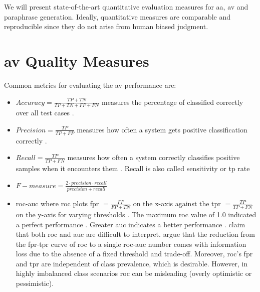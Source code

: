
We will present state-of-the-art quantitative evaluation measures for \ac{aa}, \ac{av} and paraphrase generation.
Ideally, quantitative measures are comparable and reproducible since they do not arise from human biased judgment.

\section{\ac{av} Quality Measures}
\label{sec:av_quality_measures}

Common metrics for evaluating the \ac{av} performance are:
\begin{itemize}
    \item $Accuracy = \frac{TP + TN}{TP + TN + FP + FN}$ \citep{elmanarelbouanani_authorship_2014,neal_surveying_2018} 
    measures the percentage of classified correctly over all test cases \citep{neal_surveying_2018}.

    \item $Precision = \frac{TP}{TP + FP}$ \citep{elmanarelbouanani_authorship_2014,neal_surveying_2018,chen_web_2008} 
    measures how often a system gets positive classification correctly \citep{neal_surveying_2018}.

    \item $Recall = \frac{TP}{TP + FN}$ \citep{elmanarelbouanani_authorship_2014,neal_surveying_2018,chen_web_2008} 
    measures how often a system correctly classifies positive samples when it encounters them \citep{neal_surveying_2018}.
    Recall is also called sensitivity or \acl{tp} rate \citep{palivela_optimization_2021}

    \item $F-measure = \frac{2 \cdot precision \cdot recall}{precision + recall}$~\citep{chen_web_2008,abbasi_writeprints_2008}

    \item \ac{roc-auc} \citep{bevendorff_overview_2024,weerasinghe_feature_vector_difference_2021,kocher_unine_2015}
    where \ac{roc} plots \ac{fpr} $= \frac{FP}{FP+TN}$ on the x-axis against the \ac{tpr} $=\frac{TP}{TP+FN}$ on the y-axis 
    for varying thresholds \citep{kocher_unine_2015,neal_surveying_2018}.
    The maximum \ac{roc} value of 1.0 indicated a perfect performance \citep{kocher_unine_2015}.
    Greater \ac{auc} indicates a better performance \citep{neal_surveying_2018}.
    \citet{kocher_unine_2015} claim that both \ac{roc} and \ac{auc} are difficult to interpret.
    \citet{llm_detection_av_2025} argue that the reduction from the \ac{fpr}-\ac{tpr} curve of \ac{roc} to a single \ac{roc-auc} number 
    comes with information loss due to the absence of a fixed threshold and trade-off.
    Moreover, \ac{roc}'s \ac{fpr} and \ac{tpr} are independent of class prevalence, which is desirable.
    However, in highly imbalanced class scenarios \ac{roc} can be misleading (overly optimistic or pessimistic).
    

\end{itemize}
